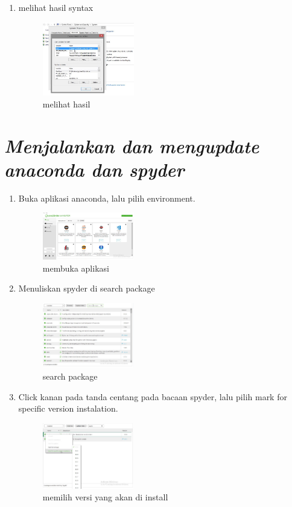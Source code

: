 \begin{enumerate}
\begin{enumerate}
\item melihat hasil syntax
\begin{figure}[hb]
\includegraphics[width=4cm]{figure/setting4.png}
\centering
\caption{melihat hasil}
\end{figure}

\end{enumerate}

\section*{\textit{ Menjalankan dan mengupdate anaconda dan spyder }}

\begin{enumerate}

\item Buka aplikasi anaconda, lalu pilih environment.
\begin{figure}[hb]
\includegraphics[width=4cm]{figure/update1.png}
\centering
\caption{membuka aplikasi}
\end{figure}

\item Menuliskan spyder di search package
\begin{figure}[hb]
\includegraphics[width=4cm]{figure/update2.png}
\centering
\caption{search package}
\end{figure}

\item Click kanan pada tanda centang pada bacaan spyder, lalu pilih mark for specific version instalation.
\begin{figure}[hb]
\includegraphics[width=4cm]{figure/update3.png}
\centering
\caption{memilih versi yang akan di install}
\end{figure}


\end{enumerate}
\end{enumerate}
